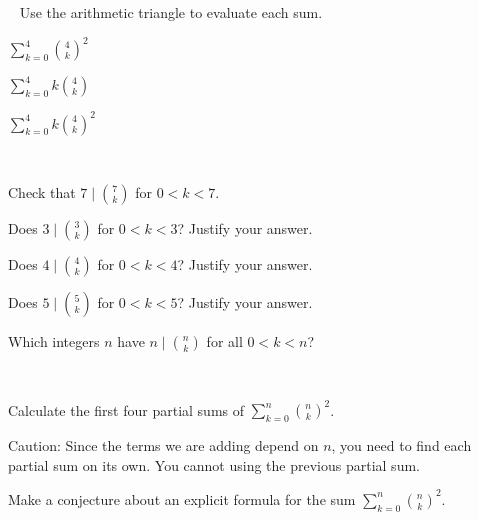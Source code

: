 \begin{exer}[\exerP] %
\label{exer_sums_row4_arith_tri}
~
    Use the arithmetic triangle to evaluate each sum.
    \begin{exerpart}
        \item \label{part_sum_sq_row4_arith_tri} $\displaystyle \sum_{k=0}^4\binom{4}{k}^2$
        \item \label{part_sum_ktimes_row4_arith_tri}$\displaystyle \sum_{k=0}^4k\binom{4}{k}$
        \item \label{part_sum_ktimes_sq_row4_arith_tri}$\displaystyle \sum_{k=0}^4k\binom{4}{k}^2$ 
    \end{exerpart}
\end{exer}

\begin{exer}[\exerU] %
\label{exer_div_arith_triangle}
~
    \begin{exerpart}
        \item Check that $\displaystyle 7\mid \binom{7}{k}$ for $0 < k < 7$.
        \item Does $\displaystyle 3\mid \binom{3}{k}$ for $0 < k < 3$?  Justify your answer.
        \item Does $\displaystyle 4\mid \binom{4}{k}$ for $0 < k < 4$?  Justify your answer.
        \item Does $\displaystyle 5\mid \binom{5}{k}$ for $0 < k < 5$?  Justify your answer.
        \item Which integers $n$ have $\displaystyle n \mid \binom{n}{k}$ for all $0 < k < n$?
    \end{exerpart}
\end{exer}

\begin{exer}[\exerU] %
\label{exer_sums_sq_rows_arith_tri}
~
    \begin{exerpart}
        \item Calculate the first four partial sums of $\displaystyle \sum_{k=0}^n\binom{n}{k}^2$.  
        
        Caution: Since the terms we are adding depend on $n$, you need to find each partial sum on its own.  You cannot using the previous partial sum.
        
        \item Make a conjecture about an explicit formula for the sum $\displaystyle \sum_{k=0}^n\binom{n}{k}^2$.        
    \end{exerpart}
\end{exer}

